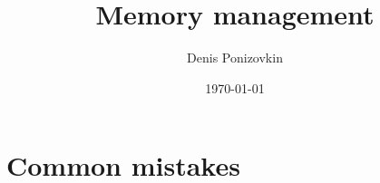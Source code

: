 \documentclass{bredelebeamer}
\begin{document}
\title{Memory management}   
\author{Denis Ponizovkin} 
\date{\today} 

\institute[<EPAM>]

\frame{\titlepage} 






\section{Common mistakes}
\end{document}
